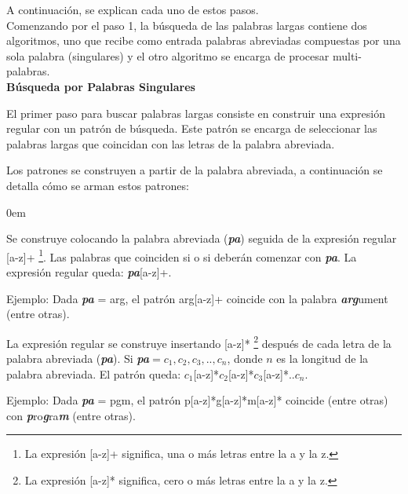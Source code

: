 A continuación, se explican cada uno de estos pasos.\\

Comenzando por el paso 1, la búsqueda de las palabras largas contiene dos algoritmos, uno que recibe como entrada palabras abreviadas compuestas por una sola palabra (singulares) y el otro algoritmo se encarga de procesar multi-palabras.\\

\noindent \textbf{Búsqueda por Palabras Singulares\\}

El primer paso para buscar palabras largas consiste en construir una expresión regular con un patrón de búsqueda.  Este patrón se encarga de seleccionar las palabras largas que coincidan con las letras de la palabra abreviada.

Los patrones se construyen a partir de la palabra abreviada, a continuación se detalla cómo se arman estos patrones: 

\begin{description}
\itemsep0em%
\item[Patrón prefijo:] Se construye colocando la palabra abreviada (\textit{\textbf{pa}}) seguida de la expresión regular [a-z]+ \footnote[1]{La expresión [a-z]+ significa, una o más letras entre la a y la z.}. Las palabras que coinciden si o si deberán comenzar con \textit{\textbf{pa}}. La expresión regular queda: \textit{\textbf{pa}}[a-z]+.

Ejemplo: Dada \textit{\textbf{pa}} = \textsf{arg}, el patrón \textsf{arg}[a-z]+ coincide con la palabra \textit{\textbf{arg}}ument (entre otras).

\item[Patrón compuesto por letras:]  La expresión regular se construye insertando [a-z]* \footnote[2]{La expresión [a-z]* significa, cero o más letras entre la a y la z.} después de cada letra de la palabra abreviada (\textit{\textbf{pa}}). Si \textit{\textbf{pa}}$=c_{1},c_{2},c_{3},..,c_{n}$, donde $n$ es la longitud de la palabra abreviada. El patrón queda: $c_{1}$[a-z]*$c_{2}$[a-z]*$c_{3}$[a-z]*..$c_{n}$.

Ejemplo: Dada \textit{\textbf{pa}} = \textsf{pgm}, el patrón \textsf{p}[a-z]*\textsf{g}[a-z]*\textsf{m}[a-z]* coincide (entre otras) con  \textit{\textbf{p}}ro\textit{\textbf{g}}ra\textit{\textbf{m}} (entre otras).
\end{description}



